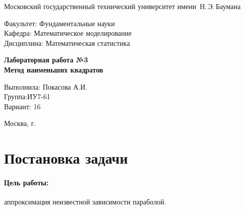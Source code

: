 \documentclass[a4paper, 12pt]{article}
\theoremstyle{definition}
\begin{document}
\thispagestyle{empty}

\begin{center}
	\Large
	Московский государственный технический университет имени~Н.\,Э.\,Баумана
\end{center}

\hfill\begin{minipage}{0.77\textwidth}
	{\large
		\noindent
		Факультет: Фундаментальные науки\\[2mm]
		\noindent
		Кафедра:  Математическое моделирование\\[2mm]
		\noindent
		Дисциплина: Математическая статистика 
		\vspace{1.5cm}}
\end{minipage}
\vfill

\begin{center}
	\Large
	\textbf{Лабораторная работа №3 \\}
	\textbf{Метод наименьших квадратов} \\
\end{center}
\vfill

\hfill\begin{minipage}{0.35\textwidth}\textsl{}
	Выполнила: Покасова А.И.\\
	Группа:ИУ7-61 \\
	Вариант: 16
\end{minipage}
\vfill

\begin{center}
	Москва, \the\year\space г.
\end{center}

\newpage
\section{Постановка задачи}

\paragraph{Цель работы:}аппроксимация неизвестной зависимости параболой.
\end{document}

